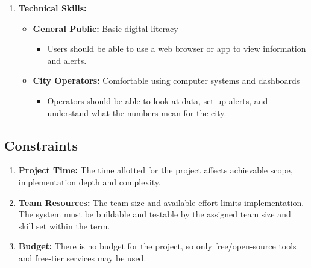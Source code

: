 {\begin{enumerate}
    \item \textbf{Technical Skills:}
    \begin{itemize}
        \item \textbf{General Public:} Basic digital literacy
        \begin{itemize}
            \item Users should be able to use a web browser or app to view information and alerts.
        \end{itemize}
        \item \textbf{City Operators:} Comfortable using computer systems and dashboards
        \begin{itemize}
            \item Operators should be able to look at data, set up alerts, and understand what the numbers mean for the city.
        \end{itemize}
    \end{itemize}
\end{enumerate}

\subsection{Constraints}
\label{sub:constraints}
\begin{enumerate}
	\item \textbf{Project Time:} The time allotted for the project affects achievable scope, implementation depth and complexity.
    \item \textbf{Team Resources:} The team size and available effort limits implementation. The system must be buildable and testable by the assigned team size and skill set within the term.
    \item \textbf{Budget:} There is no budget for the project, so only free/open-source tools and free-tier services may be used.
\end{enumerate}

}
